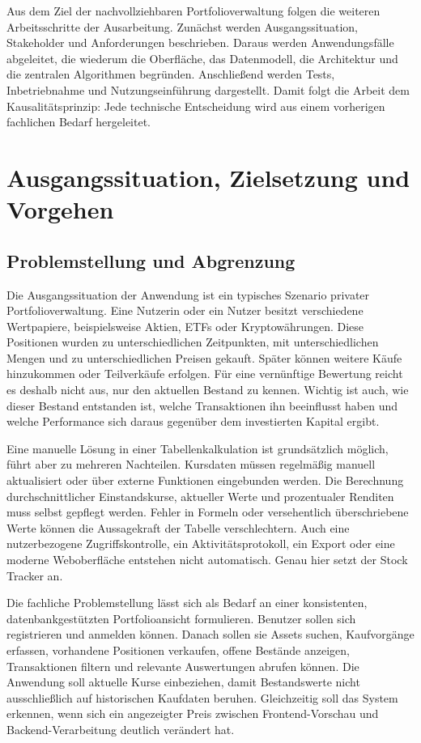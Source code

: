 \documentclass[12pt,a4paper]{article}
\begin{document}
Aus dem Ziel der nachvollziehbaren Portfolioverwaltung folgen die weiteren Arbeitsschritte der Ausarbeitung. Zunächst werden Ausgangssituation, Stakeholder und Anforderungen beschrieben. Daraus werden Anwendungsfälle abgeleitet, die wiederum die Oberfläche, das Datenmodell, die Architektur und die zentralen Algorithmen begründen. Anschließend werden Tests, Inbetriebnahme und Nutzungseinführung dargestellt. Damit folgt die Arbeit dem Kausalitätsprinzip: Jede technische Entscheidung wird aus einem vorherigen fachlichen Bedarf hergeleitet.

\newpage
\section{Ausgangssituation, Zielsetzung und Vorgehen}

\subsection{Problemstellung und Abgrenzung}

Die Ausgangssituation der Anwendung ist ein typisches Szenario privater Portfolioverwaltung. Eine Nutzerin oder ein Nutzer besitzt verschiedene Wertpapiere, beispielsweise Aktien, ETFs oder Kryptowährungen. Diese Positionen wurden zu unterschiedlichen Zeitpunkten, mit unterschiedlichen Mengen und zu unterschiedlichen Preisen gekauft. Später können weitere Käufe hinzukommen oder Teilverkäufe erfolgen. Für eine vernünftige Bewertung reicht es deshalb nicht aus, nur den aktuellen Bestand zu kennen. Wichtig ist auch, wie dieser Bestand entstanden ist, welche Transaktionen ihn beeinflusst haben und welche Performance sich daraus gegenüber dem investierten Kapital ergibt.

Eine manuelle Lösung in einer Tabellenkalkulation ist grundsätzlich möglich, führt aber zu mehreren Nachteilen. Kursdaten müssen regelmäßig manuell aktualisiert oder über externe Funktionen eingebunden werden. Die Berechnung durchschnittlicher Einstandskurse, aktueller Werte und prozentualer Renditen muss selbst gepflegt werden. Fehler in Formeln oder versehentlich überschriebene Werte können die Aussagekraft der Tabelle verschlechtern. Auch eine nutzerbezogene Zugriffskontrolle, ein Aktivitätsprotokoll, ein Export oder eine moderne Weboberfläche entstehen nicht automatisch. Genau hier setzt der Stock Tracker an.

Die fachliche Problemstellung lässt sich als Bedarf an einer konsistenten, datenbankgestützten Portfolioansicht formulieren. Benutzer sollen sich registrieren und anmelden können. Danach sollen sie Assets suchen, Kaufvorgänge erfassen, vorhandene Positionen verkaufen, offene Bestände anzeigen, Transaktionen filtern und relevante Auswertungen abrufen können. Die Anwendung soll aktuelle Kurse einbeziehen, damit Bestandswerte nicht ausschließlich auf historischen Kaufdaten beruhen. Gleichzeitig soll das System erkennen, wenn sich ein angezeigter Preis zwischen Frontend-Vorschau und Backend-Verarbeitung deutlich verändert hat.
\end{document}
